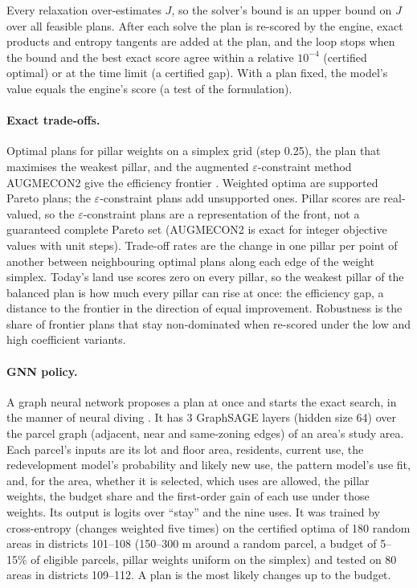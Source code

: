 \documentclass[10pt]{article}
\begin{document}
Every relaxation over-estimates $J$, so the solver's bound is an upper bound on $J$ over all feasible plans. After each
solve the plan is re-scored by the engine, exact products and entropy tangents are added at the plan, and the loop stops
when the bound and the best exact score agree within a relative $10^{-4}$ (certified optimal) or at the time limit
(a certified gap). With a plan fixed, the model's value equals the engine's score (a test of the formulation).

\paragraph{Exact trade-offs.} Optimal plans for pillar weights on a simplex grid (step 0.25), the plan that
maximises the weakest pillar, and the augmented $\varepsilon$-constraint method AUGMECON2 \citep{mavrotas2013} give
the efficiency frontier \citep{polasky2008}. Weighted optima are supported Pareto plans; the $\varepsilon$-constraint
plans add unsupported ones. Pillar scores are real-valued, so the $\varepsilon$-constraint plans are a representation
of the front, not a guaranteed complete Pareto set (AUGMECON2 is exact for integer objective values with unit steps). Trade-off rates are
the change in one pillar per point of another between neighbouring optimal plans along each edge of the weight
simplex. Today's land use scores zero on every pillar, so the weakest pillar of the balanced plan is how much every
pillar can rise at once: the efficiency gap, a distance to the frontier in the direction of equal improvement. Robustness is the share of frontier plans that stay non-dominated when
re-scored under the low and high coefficient variants.

\paragraph{GNN policy.} A graph neural network proposes a plan at once and starts the exact search, in the manner of
neural diving \citep{nair2020}. It has 3 GraphSAGE layers \citep{hamilton2017} (hidden size
64) over the parcel graph (adjacent, near and same-zoning edges) of an area's study area. Each parcel's
inputs are its lot and floor area, residents, current use, the redevelopment model's probability and likely new use,
the pattern model's use fit, and, for the area, whether it is selected, which uses are allowed, the pillar weights, the
budget share and the first-order gain of each use under those weights. Its output is logits over ``stay'' and the nine
uses. It was trained by cross-entropy (changes weighted five times) on the certified optima of 180 random
areas in districts 101--108 (150--300 m around a random parcel, a budget of 5--15\% of eligible parcels, pillar
weights uniform on the simplex) and tested on 80 areas in districts 109--112. A plan is the most likely
changes up to the budget.
\end{document}
